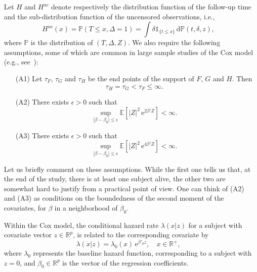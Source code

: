 \documentclass[11pt,reqno]{amsart}
\theoremstyle{definition}
\theoremstyle{plain}
\theoremstyle{remark}
\begin{document}
Let $H$ and $H^{uc}$ denote respectively the distribution function of the follow-up time and the sub-distribution function of the uncensored observations, i.e.,
\begin{equation}
\label{eq:def Huc}
H^{uc}(x)={\mathbb{P}}(T\leq x,\Delta=1)=\int \delta{\mathds{1}}_{\{t\leq x\}}\,\mathrm{d}\mathbb{P}(t,\delta,z),
\end{equation}
where ${\mathbb{P}}$ is the distribution of $(T,\Delta,Z)$.
We also require the following assumptions, some of which are common in large sample studies of the Cox model (e.g., see~\cite{LopuhaaNane2013}):
\begin{itemize}
\item[(A1)]
Let $\tau_F,\,\tau_G$ and $\tau_H$ be the end points of the support of $F,\,G$ and $H$. Then
\[
\tau_H=\tau_G<\tau_F\leq\infty.
\]
\item[(A2)]
There exists $\epsilon>0$ such that
\[
\sup_{|\beta-\beta_0|\leq\epsilon}{\mathbb{E}}\left[|Z|^2\,\mathrm{e}^{2\beta'Z}\right]<\infty.
\]
\item[(A3)]
There exists $\epsilon>0$ such that
\[
\sup_{|\beta-\beta_0|\leq\epsilon}{\mathbb{E}}\left[|Z|^2\,\mathrm{e}^{4\beta'Z}\right]<\infty.
\]
\end{itemize}
Let us briefly comment on these assumptions.
While the first one tells us that, at the end of the study, there is at least one subject alive, the other
two are somewhat hard to justify from a practical point of view.
One can think of (A2) and (A3) as conditions on the boundedness of the second moment of the covariates, for $\beta$ in a neighborhood of $\beta_0$.

Within the Cox model, the conditional hazard rate $\lambda(x|z)$ for a subject with covariate vector $z\in{\mathbb{R}}^p$, is related to the corresponding covariate by
\[
\lambda(x|z)=\lambda_0(x)\,\mathrm{e}^{\beta'_0z},\quad x\in{\mathbb{R}}^+,
\]
where $\lambda_0$ represents the baseline hazard function, corresponding to a subject with $z=0$, and $\beta_0\in{\mathbb{R}}^p$ is the vector of the regression coefficients.
\end{document}
